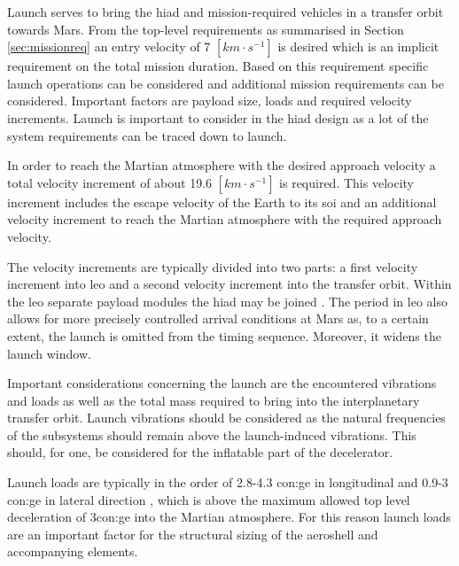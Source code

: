 Launch serves to bring the \gls{hiad} and mission-required vehicles in a transfer orbit towards Mars. From the top-level requirements as summarised in Section \ref{sec:missionreq} an entry velocity of 7 $[km\cdot s^{-1}]$ is desired which is an implicit requirement on the total mission duration.
Based on this requirement specific launch operations can be considered and additional mission requirements can be considered. Important factors are payload size, loads and required velocity increments. Launch is important to consider in the \gls{hiad} design as a lot of the system requirements can be traced down to launch.

In order to reach the Martian atmosphere with the desired approach velocity a total velocity increment of about 19.6 $[km\cdot s^{-1}]$ is required. This velocity increment includes the escape velocity of the Earth to its \gls{soi} and an additional velocity increment to reach the Martian atmosphere with the required approach velocity.

The velocity increments are typically divided into two parts: a first velocity increment into \gls{leo} and a second velocity increment into the transfer orbit. Within the \gls{leo} separate payload modules the \gls{hiad} may be joined \cite{George2009}. The period in \gls{leo} also allows for more precisely controlled arrival conditions at Mars as, to a certain extent, the launch is omitted from the timing sequence. Moreover, it widens the launch window.


Important considerations concerning the launch are the encountered vibrations and loads as well as the total mass required to bring into the interplanetary transfer orbit. Launch vibrations should be considered as the natural frequencies of the subsystems should remain above the launch-induced vibrations. This should, for one, be considered for the inflatable part of the decelerator.

Launch loads are typically in the order of 2.8-4.3 \gls{con:ge} in longitudinal and 0.9-3 \gls{con:ge} in lateral direction \cite{Wertz2011}, which is above the maximum allowed top level deceleration of 3\gls{con:ge} into the Martian atmosphere. For this reason launch loads are an important factor for the structural sizing of the aeroshell and accompanying elements. 

